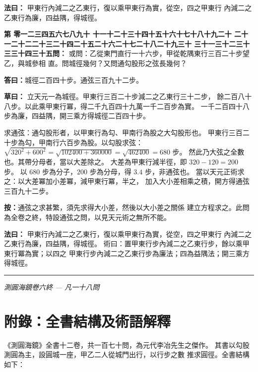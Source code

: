 \documentclass[11pt,a4paper]{article}
\newcommand{\longline}{\noindent\rule{\textwidth}{0.4pt}}
\newcounter{probnum}
\newcommand{\chnum}[1]{%
  \ifcase#1 零\or 一\or 二\or 三\or 四\or 五\or 六\or 七\or 八\or 九\or 十\or
    十一\or 十二\or 十三\or 十四\or 十五\or 十六\or 十七\or 十八\or 十九\or 二十\or
    二十一\or 二十二\or 二十三\or 二十四\or 二十五\or 二十六\or 二十七\or 二十八\or 二十九\or 三十\or
    三十一\or 三十二\or 三十三\or 三十四\or 三十五\fi}
\newcommand{\problem}[1]{\stepcounter{probnum}\par\noindent\textbf{第\chnum{\value{probnum}}問：}#1\par\vspace{0.2cm}}
\newcommand{\answer}[1]{\par\noindent\textbf{答曰：}#1\par\vspace{0.2cm}}
\newcommand{\working}[1]{\par\noindent\textbf{草曰：}#1\par\vspace{0.2cm}}
\newcommand{\method}[1]{\par\noindent\textbf{法曰：}#1\par\vspace{0.3cm}}
\begin{document}
\method{
甲東行內減二之乙東行，復以乘甲東行為實，從空，四之甲東行
內減二之乙東行為廉，四益隅，得城徑。
}

\problem{
或問：乙從東門直行一十六步，甲從乾隅東行三百二十步望乙，與城參相
直。問城徑幾何？又問通勾股形之弦長幾何？
}

\answer{城徑二百四十步。通弦三百九十二步。}

\working{
立天元一為城徑。甲東行三百二十步減二之乙東行三十二步，
餘二百八十八步。以此乘甲東行冪，得二千九百四十九萬一千二百步為實。
一千二百四十八步為廉，四益隅，開三乘方得城徑二百四十步。

求通弦：通勾股形者，以甲東行為勾、甲南行為股之大勾股形也。
甲東行三百二十步為勾，甲南行六百步為股。以勾股求弦：
$\sqrt{320^2 + 600^2} = \sqrt{102400 + 360000} = \sqrt{462400} = 680$ 步。
然此乃大弦之全數也。其帶分母者，當以大差除之。
大差為甲東行減半徑，即 $320 - 120 = 200$ 步。
以 $680$ 步為分子，$200$ 步為分母，得 $3.4$ 步，非通弦也。
當以天元正術求之：以大差冪加小差冪，減甲東行冪，半之，
加入大小差相乘之積，開方得通弦三百九十二步。

\textbf{按：}通弦之求甚繁，須先求得大小差，然後以大小差之關係
建立方程求之。此問為全卷之終，特設通弦之問，以見天元術之無所不能。
}

\method{
甲東行內減二之乙東行，復以乘甲東行為實，從空，四之甲東行
內減二之乙東行為廉，四益隅，得城徑。
術曰：置甲東行步內減二之乙東行步，餘以乘甲東行冪為實；以四之
甲東行步內減二之乙東行步為廉法；四為益隅法；開三乘方得城徑。
}

\vspace{0.5cm}
\longline
\begin{center}
\textit{測圓海鏡卷六終 --- 凡一十八問}
\end{center}

\newpage

\section*{附錄：全書結構及術語解釋}

《測圓海鏡》全書十二卷，共一百七十問，為元代李冶先生之傑作。
其書以勾股測圓為主，設圓城一座，甲乙二人從城門出行，以行步之數
推求圓徑。全書結構如下：
\end{document}
